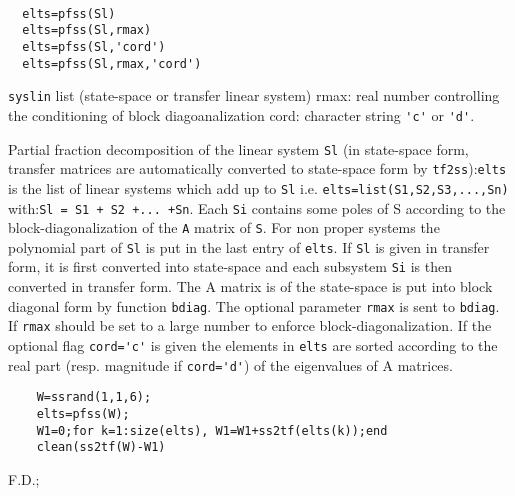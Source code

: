\begin{mandesc}
   \\ %
\end{mandesc}
\begin{calling_sequence}
\begin{verbatim}
  elts=pfss(Sl)  
  elts=pfss(Sl,rmax)  
  elts=pfss(Sl,'cord')  
  elts=pfss(Sl,rmax,'cord')  
\end{verbatim}
\end{calling_sequence}
\begin{parameters}
  \begin{varlist}
     \verb!syslin! list (state-space or transfer linear system)
    rmax: real number controlling the conditioning of block
    diagoanalization cord: character string \verb!'c'!
    or \verb!'d'!.
  \end{varlist}
\end{parameters}
\begin{mandescription}
  Partial fraction decomposition of the linear system \verb!Sl! (in state-space 
  form, transfer matrices are automatically converted to state-space form
  by \verb!tf2ss!):\verb!elts! is the list of linear systems which add up to \verb!Sl!
  i.e. \verb!elts=list(S1,S2,S3,...,Sn)! with:\verb!Sl = S1 + S2 +... +Sn!.
  Each \verb!Si! contains some poles of \verb!!S according to the 
  block-diagonalization of the \verb!A! matrix of \verb!S!.
  For non proper systems the polynomial part of \verb!Sl! is put
  in the last entry of \verb!elts!.
  If \verb!Sl! is given in transfer form, it is first converted into state-space
  and each subsystem \verb!Si! is then converted in transfer form.
  The A matrix is of the state-space is put into block diagonal form
  by function \verb!bdiag!. The optional parameter \verb!rmax! is sent to
  \verb!bdiag!. If \verb!rmax! should be set to a large number to enforce
  block-diagonalization.
  If the optional flag \verb!cord='c'! is given the elements in \verb!elts!
  are sorted according to the real part (resp. magnitude if \verb!cord='d'!)
  of the eigenvalues of A matrices.
\end{mandescription}
\begin{examples}
  \begin{Verbatim}
    W=ssrand(1,1,6);
    elts=pfss(W); 
    W1=0;for k=1:size(elts), W1=W1+ss2tf(elts(k));end
    clean(ss2tf(W)-W1)
  \end{Verbatim}
\end{examples}
\begin{manseealso}
       
\end{manseealso}
\begin{authors}
  F.D.;   
\end{authors}
